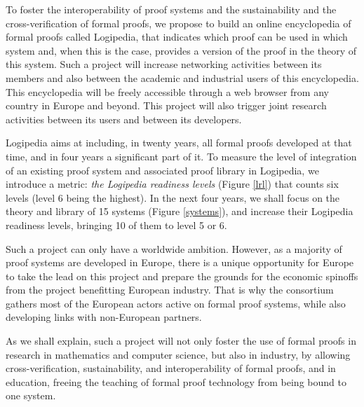 To foster the interoperability of proof systems and the sustainability
and the cross-verification of formal proofs, we propose to build an
online encyclopedia of formal proofs called {\sc Logipedia}, that
indicates which proof can be used in which system and, when this is the
case, provides a version of the proof in the theory of this system.
Such a project will increase networking activities between its members
and also between the academic and industrial users of this
encyclopedia.  This encyclopedia will be freely accessible through a
web browser from any country in Europe and beyond. This project will
also trigger joint research activities between its users and between
its developers.

{\sc Logipedia} aims at including, in twenty years, all formal proofs developed
at that time, and in four years a significant part of it. To measure the level
of integration of an existing proof system and associated proof library in {\sc
  Logipedia}, we introduce a metric: {\em the {\sc Logipedia} readiness
  levels} (Figure \ref{lrl}) that counts six levels (level 6 being the highest).
In the next four years, we shall focus on the theory and library of 15
systems (Figure \ref{systems}), and increase their {\sc Logipedia} readiness
levels, bringing 10 of them to level 5 or 6.

Such a project can only have a worldwide ambition. However, as a majority of
proof systems are developed in Europe, there is a unique opportunity for Europe
to take the lead on this project and prepare the grounds for the economic
spinoffs from the project benefitting European industry. That is why the
consortium gathers most of the European actors active on formal proof systems,
while also developing links with non-European partners.

As we shall explain, such a project will not only foster the use of
formal proofs in research in mathematics and computer science, but
also in industry, by allowing cross-verification, sustainability, and
interoperability of formal proofs, and in education, freeing the
teaching of formal proof technology from being bound to one system. 


